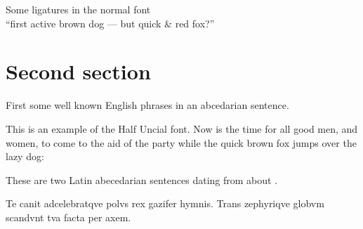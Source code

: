 \documentclass{article}
\newcommand{\Romannum}[1]{\uppercase\expandafter{\romannumeral #1}}
\newcommand{\Sentence}{%
This is an example of the Half Uncial font. Now is the time for all good
men, and women, to come to the aid of the party while the quick brown fox
jumps over the lazy dog:}
\newcommand{\latin}{Te canit adcelebratqve polvs rex gazifer hymnis.
  Trans zephyriqve globvm scandvnt tva facta per axem.}
\begin{document}
\begin{center}
    Some ligatures in the normal font \\
{``first active brown dog --- but quick \& red fox?''}
\end{center}

\section{Second section}

    First some well known English phrases in an abcedarian sentence.

\Sentence{}

    These are two Latin abecedarian sentences dating from about 
\Romannum{790}.

\latin{}

\end{document}
